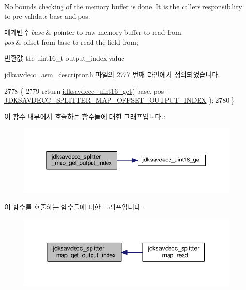 No bounds checking of the memory buffer is done. It is the caller\textquotesingle{}s responsibility to pre-\/validate base and pos.


\begin{DoxyParams}{매개변수}
{\em base} & pointer to raw memory buffer to read from. \\
\hline
{\em pos} & offset from base to read the field from; \\
\hline
\end{DoxyParams}
\begin{DoxyReturn}{반환값}
the uint16\+\_\+t output\+\_\+index value 
\end{DoxyReturn}


jdksavdecc\+\_\+aem\+\_\+descriptor.\+h 파일의 2777 번째 라인에서 정의되었습니다.


\begin{DoxyCode}
2778 \{
2779     \textcolor{keywordflow}{return} \hyperlink{group__endian_ga3fbbbc20be954aa61e039872965b0dc9}{jdksavdecc\_uint16\_get}( base, pos + 
      \hyperlink{group__splitter__map_gad8b95ea5fd87ee76b96c5deac7cdcd8a}{JDKSAVDECC\_SPLITTER\_MAP\_OFFSET\_OUTPUT\_INDEX} );
2780 \}
\end{DoxyCode}


이 함수 내부에서 호출하는 함수들에 대한 그래프입니다.\+:
\nopagebreak
\begin{figure}[H]
\begin{center}
\leavevmode
\includegraphics[width=350pt]{group__splitter__map_ga18ec23b2d17f762844bf81166d311c31_cgraph}
\end{center}
\end{figure}




이 함수를 호출하는 함수들에 대한 그래프입니다.\+:
\nopagebreak
\begin{figure}[H]
\begin{center}
\leavevmode
\includegraphics[width=337pt]{group__splitter__map_ga18ec23b2d17f762844bf81166d311c31_icgraph}
\end{center}
\end{figure}


